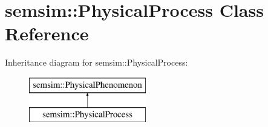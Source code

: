 \hypertarget{classsemsim_1_1PhysicalProcess}{}\section{semsim\+:\+:Physical\+Process Class Reference}
\label{classsemsim_1_1PhysicalProcess}
Inheritance diagram for semsim\+:\+:Physical\+Process\+:\begin{figure}[H]
\begin{center}
\leavevmode
\includegraphics[height=2.000000cm]{classsemsim_1_1PhysicalProcess}
\end{center}
\end{figure}
